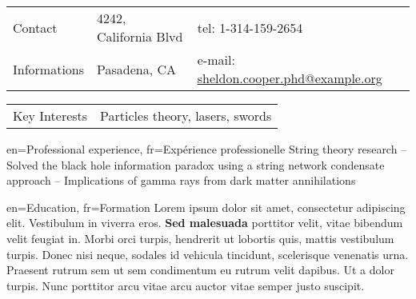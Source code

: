 \documentclass[letter]{article}
\author{Sheldon Cooper}
\begin{document}
\maketitle

\noindent
\begin{tabular}{p{3.5cm}p{8cm}p{7cm}}
{\small\sc Contact}       & 4242, California Blvd       & tel: 1-314-159-2654   \\
{\small\sc Informations}  & Pasadena, CA                & e-mail: \url{sheldon.cooper.phd@example.org} \vspace{0.5em}
\end{tabular}
\begin{tabular}{p{3.5cm}p{15cm}}
{\small\sc Key Interests} & Particles theory, lasers, swords \\
\end{tabular}

  
\begin{section}{en={Professional experience}, 
                fr={Expérience professionelle}}
    {String theory research \newline
     {\small
      \indent -- Solved the black hole information paradox using a string network condensate approach \newline
      \indent -- Implications of gamma rays from dark matter annihilations
     }
    }
\end{section}

\begin{section}{en={Education}, 
              fr={Formation}}
        {Lorem ipsum dolor sit amet, consectetur adipiscing elit. Vestibulum in viverra eros. \textbf{Sed malesuada} porttitor velit, vitae bibendum velit feugiat in. Morbi orci turpis, hendrerit ut lobortis quis, mattis vestibulum turpis. Donec nisi neque, sodales id vehicula tincidunt, scelerisque venenatis urna.}
        {Praesent rutrum sem ut sem condimentum eu rutrum velit dapibus. Ut a dolor turpis. \newline
         Nunc porttitor arcu vitae arcu auctor vitae semper justo suscipit.}
\end{section}
\end{document}
